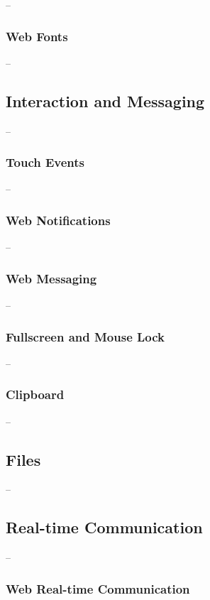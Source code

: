 --

\subsubsection{Web Fonts}

--

\subsection{Interaction and Messaging}

--

\subsubsection{Touch Events}

--

\subsubsection{Web Notifications}

--

\subsubsection{Web Messaging}

--

\subsubsection{Fullscreen and Mouse Lock}

--

\subsubsection{Clipboard}

--

\subsection{Files}

--

\subsection{Real-time Communication}

--

\subsubsection{Web Real-time Communication}

